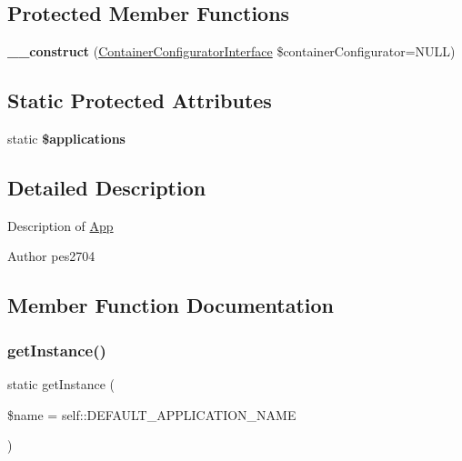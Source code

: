 \subsection*{Protected Member Functions}
\begin{DoxyCompactItemize}
\item 
\mbox{\label{class_application_1_1_app_aa989fd92a4dbd95605c2b4982ccfe6bb}} 
{\bfseries \+\_\+\+\_\+construct} (\mbox{\hyperlink{interface_pes_1_1_container_1_1_container_configurator_interface}{Container\+Configurator\+Interface}} \$container\+Configurator=N\+U\+LL)
\end{DoxyCompactItemize}
\subsection*{Static Protected Attributes}
\begin{DoxyCompactItemize}
\item 
\mbox{\label{class_application_1_1_app_afef56ede1225281b9c96d0cf2f0a0196}} 
static {\bfseries \$applications}
\end{DoxyCompactItemize}


\subsection{Detailed Description}
Description of \mbox{\hyperlink{class_application_1_1_app}{App}}

\begin{DoxyAuthor}{Author}
pes2704 
\end{DoxyAuthor}


\subsection{Member Function Documentation}
\mbox{\label{class_application_1_1_app_af9184f047ad24cd760b3d521823741e5}} 
\subsubsection{\texorpdfstring{get\+Instance()}{getInstance()}}
{\footnotesize\ttfamily static get\+Instance (\begin{DoxyParamCaption}\item[{}]{\$name = {\ttfamily self\+:\+:DEFAULT\+\_\+APPLICATION\+\_\+NAME} }\end{DoxyParamCaption})\hspace{0.3cm}{\ttfamily [static]}}

